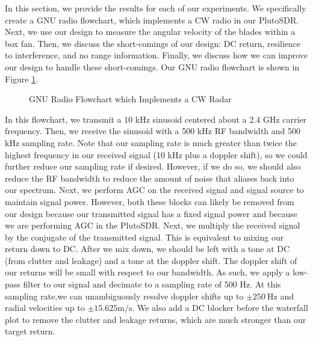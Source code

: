 \documentclass{article}
\begin{document}
In this section, we provide the results for each of our experiments. We specifically create a GNU radio flowchart, which implements a CW radio in our PlutoSDR. Next, we use our design to measure the angular velocity of the blades within a box fan. Then, we discuss the short-comings of our design: DC return, resilience to interference, and no range information. Finally, we discuss how we can improve our design to handle these short-comings. Our GNU radio flowchart is shown in Figure \ref{fig::gnu_radio_block_diagram}. 

\begin{figure}[H]
    	\centering
    	\caption{GNU Radio Flowchart which Implements a CW Radar}
    	\label{fig::gnu_radio_block_diagram}
\end{figure}

\noindent In this flowchart, we transmit a 10 kHz sinusoid centered about a 2.4 GHz carrier frequency. Then, we receive the sinusoid with a 500 kHz RF bandwidth and 500 kHz sampling rate. Note that our sampling rate is much greater than twice the highest frequency in our received signal (10 kHz plus a doppler shift), so we could further reduce our sampling rate if desired. However, if we do so, we should also reduce the RF bandwidth to reduce the amount of noise that aliases back into our spectrum. Next, we perform AGC on the received signal and signal source to maintain signal power. However, both these blocks can likely be removed from our design because our transmitted signal has a fixed signal power and because we are performing AGC in the PlutoSDR. Next, we multiply the received signal by the conjugate of the transmitted signal. This is equivalent to mixing our return down to DC. After we mix down, we should be left with a tone at DC (from clutter and leakage) and a tone at the doppler shift. The doppler shift of our returns will be small with respect to our bandwidth. As such, we apply a low-pass filter to our signal and decimate to a sampling rate of 500 Hz. At this sampling rate,we can unambiguously resolve doppler shifts up to $\pm 250\ \text{Hz}$ and radial velocities up to $\pm 15.625 \text{m}/\text{s}$. We also add a DC blocker before the waterfall plot to remove the clutter and leakage returns, which are much stronger than our target return.
\end{document}
